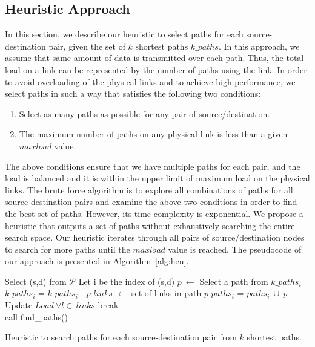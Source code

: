 \subsection{Heuristic Approach}
\label{sec:heuristic}

In this section, we describe our heuristic to select paths for each source-destination pair, given the set of $k$ shortest paths $k\_paths$. In this approach, we assume that same amount of data is transmitted over each path. Thus, the total load on a link can be represented by the number of paths using the link. In order to avoid overloading of the physical links and to achieve high performance, we select paths in such a way that satisfies the following two conditions:
\begin{enumerate}
\item Select as many paths as possible for any pair of source/destination. 
\item The maximum number of paths on any physical link is less than a given $maxload$ value.
\end{enumerate}
The above conditions ensure that we have multiple paths for each pair, and the load is balanced and it is within the upper limit of maximum load on the physical links. The brute force algorithm is to explore all combinations of paths for all source-destination pairs and examine the above two conditions in order to find the best set of paths. However, its time complexity is exponential. We propose a heuristic that outputs a set of paths without exhaustively searching the entire search space. Our heuristic iterates through all pairs of source/destination nodes to search for more paths until the $maxload$ value is reached. The pseudocode of our approach is presented in Algorithm~\ref{alg:heu}. 
\begin{algorithm}[!htbp]
	{
		Select (s,d) from $\mathcal{P}$\; 
		Let i be the index of (s,d) \;
		$p~\leftarrow$ Select a path from $k\_paths_i$ \;
		$k\_paths_i$ = $k\_paths_i$ - {$p$} \;
		{$links$} $\leftarrow$ set of links in path $p$ \;
		{
			$paths_i$ = $paths_i~\cup~{p}$ \;
			Update $Load~\forall l\in~links$ \;
		} %
		{
			break \;
		} %
	} %
~\\
	\While {($~$)} 
	{
		call find\_paths() 
	} %

\caption{Heuristic to search paths for each source-destination pair from $k$ shortest paths.}
\label{alg:heu}
\end{algorithm}

